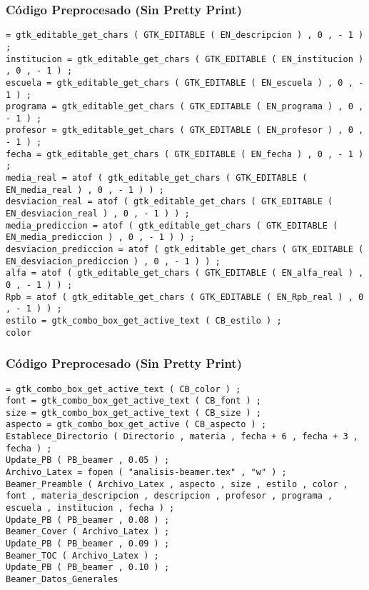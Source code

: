 \documentclass{beamer}
\begin{document}
\begin{frame}[fragile]
\frametitle{C\'odigo Preprocesado (Sin Pretty Print)}
\begin{lstlisting}[style=CStyle]
= gtk_editable_get_chars ( GTK_EDITABLE ( EN_descripcion ) , 0 , - 1 ) ; 
institucion = gtk_editable_get_chars ( GTK_EDITABLE ( EN_institucion ) , 0 , - 1 ) ; 
escuela = gtk_editable_get_chars ( GTK_EDITABLE ( EN_escuela ) , 0 , - 1 ) ; 
programa = gtk_editable_get_chars ( GTK_EDITABLE ( EN_programa ) , 0 , - 1 ) ; 
profesor = gtk_editable_get_chars ( GTK_EDITABLE ( EN_profesor ) , 0 , - 1 ) ; 
fecha = gtk_editable_get_chars ( GTK_EDITABLE ( EN_fecha ) , 0 , - 1 ) ; 
media_real = atof ( gtk_editable_get_chars ( GTK_EDITABLE ( EN_media_real ) , 0 , - 1 ) ) ; 
desviacion_real = atof ( gtk_editable_get_chars ( GTK_EDITABLE ( EN_desviacion_real ) , 0 , - 1 ) ) ; 
media_prediccion = atof ( gtk_editable_get_chars ( GTK_EDITABLE ( EN_media_prediccion ) , 0 , - 1 ) ) ; 
desviacion_prediccion = atof ( gtk_editable_get_chars ( GTK_EDITABLE ( EN_desviacion_prediccion ) , 0 , - 1 ) ) ; 
alfa = atof ( gtk_editable_get_chars ( GTK_EDITABLE ( EN_alfa_real ) , 0 , - 1 ) ) ; 
Rpb = atof ( gtk_editable_get_chars ( GTK_EDITABLE ( EN_Rpb_real ) , 0 , - 1 ) ) ; 
estilo = gtk_combo_box_get_active_text ( CB_estilo ) ; 
color \end{lstlisting}
\end{frame}
\begin{frame}[fragile]
\frametitle{C\'odigo Preprocesado (Sin Pretty Print)}
\begin{lstlisting}[style=CStyle]
= gtk_combo_box_get_active_text ( CB_color ) ; 
font = gtk_combo_box_get_active_text ( CB_font ) ; 
size = gtk_combo_box_get_active_text ( CB_size ) ; 
aspecto = gtk_combo_box_get_active ( CB_aspecto ) ; 
Establece_Directorio ( Directorio , materia , fecha + 6 , fecha + 3 , fecha ) ; 
Update_PB ( PB_beamer , 0.05 ) ; 
Archivo_Latex = fopen ( "analisis-beamer.tex" , "w" ) ; 
Beamer_Preamble ( Archivo_Latex , aspecto , size , estilo , color , font , materia_descripcion , descripcion , profesor , programa , escuela , institucion , fecha ) ; 
Update_PB ( PB_beamer , 0.08 ) ; 
Beamer_Cover ( Archivo_Latex ) ; 
Update_PB ( PB_beamer , 0.09 ) ; 
Beamer_TOC ( Archivo_Latex ) ; 
Update_PB ( PB_beamer , 0.10 ) ; 
Beamer_Datos_Generales \end{lstlisting}
\end{frame}
\end{document}
